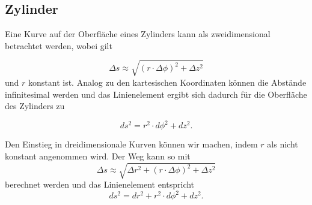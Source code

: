 %
%
%
%
\subsection{Zylinder\label{geodaeten:section:Linienelemente:Zylinder}}

Eine Kurve auf der Oberfläche eines Zylinders kann als zweidimensional betrachtet werden, wobei gilt

\begin{equation}
	\Delta s \approx \sqrt{(r \cdot \Delta \phi)^2 + \Delta z^2}
\end{equation}
und $r$ konstant ist.
Analog zu den kartesischen Koordinaten können die Abstände infinitesimal werden und das Linienelement ergibt sich dadurch für die Oberfläche des Zylinders zu

\begin{equation}
	ds^2 = r^2 \cdot d \phi^2 + d z^2 .
	\label{geodaeten:equation:Linienelemente:Zylinder:equation2}
\end{equation}

%

Den Einstieg in dreidimensionale Kurven können wir machen, indem $r$ als nicht konstant angenommen wird.
Der Weg kann so mit
\begin{equation}
	\Delta s \approx \sqrt{\Delta r^2 + (r \cdot \Delta \phi)^2 + \Delta z^2} %
\end{equation}
berechnet werden und das Linienelement entspricht 
\begin{equation}
	ds^2 = d r^2 + r^2 \cdot d \phi^2 + d z^2 .
	\label{geodaeten:equation:Linienelemente:Zylinder:Zylinder3D}
\end{equation}

